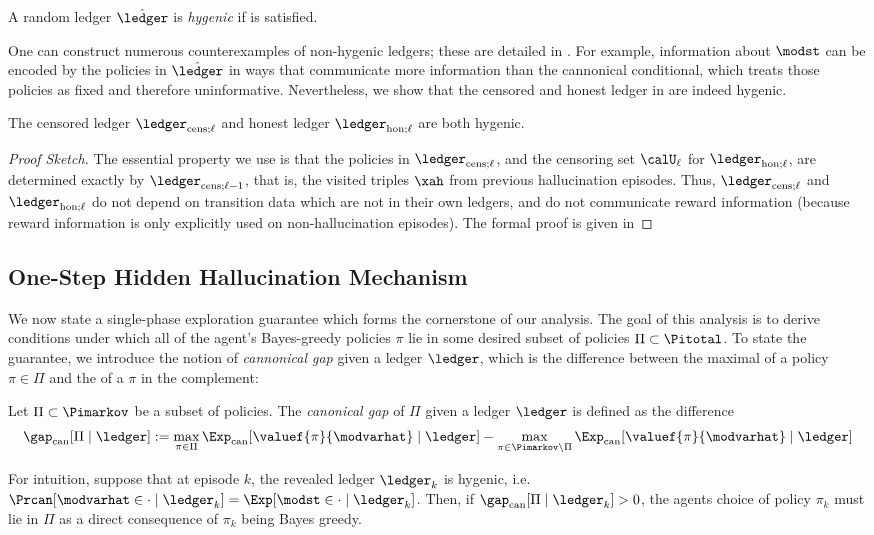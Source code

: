 \begin{definition}\label{def:hygenic} A random ledger $\hat{\ledger}$ is \emph{hygenic} if   is satisfied.
\end{definition}

One can construct numerous counterexamples of non-hygenic ledgers; these are detailed in . For example, information about $\modst$ can be encoded by the policies in $\hat{\ledger}$ in ways that communicate more information than the cannonical conditional, which treats those policies as fixed and therefore uninformative. Nevertheless, we show that the censored and honest ledger in \mdphh{} are indeed hygenic.

\begin{lemma}\label{lem:data_hygiene} The censored ledger $\ledcensl$ and honest ledger $\ledhonl$ are both hygenic.
\end{lemma}
\begin{proof}[Proof Sketch] The essential property we use is that the policies in $\ledcensl$, and the censoring set $\calU_{\ell}$ for $\ledhonl$, are determined exactly by $\ledcensl[\ell-1]$, that is, the visited triples $\xah$ from previous hallucination episodes. Thus, $\ledcensl$ and $\ledhonl$ do not depend on transition data which are not in their own ledgers, and do not communicate reward information (because reward information is only explicitly used on non-hallucination episodes). The formal proof is given in 
\end{proof}

\subsection{ One-Step Hidden Hallucination Mechanism}
We now state a single-phase exploration guarantee which forms the cornerstone of our analysis. The goal of this analysis is to derive conditions under which all of the agent's Bayes-greedy policies $\pi$ lie in some desired subset of policies $\Pi \subset \Pitotal$. To state the guarantee, we introduce the notion of \emph{cannonical gap} given a ledger $\ledger$, which is the difference between the maximal \cce{} of a policy $\pi \in \Pi$ and the \cce{} of a $\pi$ in the complement:
\begin{definition}\label{defn:cannonical_gap} Let $\Pi \subset \Pimarkov$ be a subset of policies. The \emph{canonical gap} of $\Pi$ given a ledger $\ledger$ is defined as the difference
\begin{align*}
\gapcan[\Pi \mid \ledger] := \max_{\pi \in \Pi} \Expcan[\valuef{\pi}{\modvarhat} \mid \ledger] - \max_{\pi \in \Pimarkov \setminus \Pi} \Expcan[\valuef{\pi}{\modvarhat} \mid \ledger]
\end{align*}
\end{definition}
For intuition, suppose that at episode $k$, the revealed ledger $\ledger_k$ is hygenic, i.e. $\Prcan[ \modvarhat \in \cdot \mid \ledger_k] = \Exp[\modst \in \cdot \mid \ledger_k]$. Then, if $\gapcan[\Pi \mid \ledger_k] > 0$, the agents choice of policy $\pi_k$ must lie in $\Pi$ as a direct consequence of $\pi_k$ being Bayes greedy.

